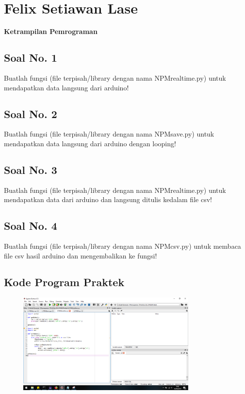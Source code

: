 \section{Felix Setiawan Lase}
{\Large \textbf{Ketrampilan Pemrograman}}
\subsection{Soal No. 1}
Buatlah  fungsi  (file  terpisah/library  dengan  nama  NPMrealtime.py)  untuk mendapatkan data langsung dari arduino!




\subsection{Soal No. 2}
Buatlah fungsi (file terpisah/library dengan nama NPMsave.py) untuk mendapatkan data langsung dari arduino dengan looping!




\subsection{Soal No. 3}
Buatlah  fungsi  (file  terpisah/library  dengan  nama  NPMrealtime.py) untuk mendapatkan data dari arduino dan langsung ditulis kedalam file csv!



\subsection{Soal No. 4}
Buatlah fungsi (file terpisah/library dengan nama NPMcsv.py) untuk membaca file csv hasil arduino dan mengembalikan ke fungsi!




\subsection{Kode Program Praktek}
\begin{figure}[H]
	\includegraphics[width=9cm]{figures/5/1174026/Praktek/realtime.png}
	\centering
\end{figure}

